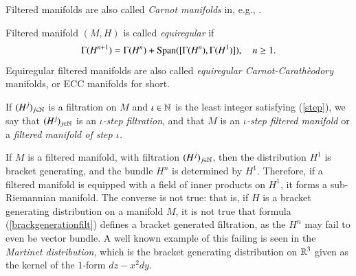 \documentclass[leqno]{amsart}
\begin{document}
	\begin{remark}
		Filtered manifolds are also called \textit{Carnot manifolds} in, e.g., \cite{Po19, MK2022,S2013}.
	\end{remark}
	
	\begin{definition}
		Filtered manifold $(M, H)$ is called \textit{equiregular} if
		\begin{equation}\label{brackgenerationfilt}
			\Gamma(H^{n+1})=\Gamma(H^n)+{\rm Span}([\Gamma(H^n),\Gamma(H^1)]),\quad n\geq 1.
		\end{equation}
		Equiregular filtered manifolds are also called \textit{equiregular Carnot-Carath\`eodory} manifolds, or ECC manifolds for short.
	\end{definition}
	
	If $(H^j)_{j\in\mathbb{N}}$ is a filtration on $M$ and $\iota\in\mathbb{N}$ is the least integer satisfying (\ref{step}), we say that $(H^j)_{j\in\mathbb{N}}$ is an \textit{$\iota$-step filtration}, and that $M$ is an \textit{$\iota$-step filtered manifold} or a \textit{filtered manifold of step $\iota$.}
	
	If $M$ is a filtered manifold, with filtration $(H^j)_{j\in\mathbb{N}}$, then the distribution $H^1$ is bracket generating, and the bundle $H^n$ is determined by $H^1$. Therefore, if a filtered manifold is equipped with a field of inner products on $H^1$, it forms a sub-Riemannian manifold. The converse is not true: that is, if $H$ is a bracket generating distribution on a manifold $M$, it is not true that formula (\ref{brackgenerationfilt}) defines a bracket generated filtration, as the $H^n$ may fail to even be vector bundle. A well known example of this failing is seen in the \textit{Martinet distribution}, which is the bracket generating distribution on $\mathbb{R}^3$ given as the kernel of the $1$-form $dz-x^2dy$. 
	
\end{document}

